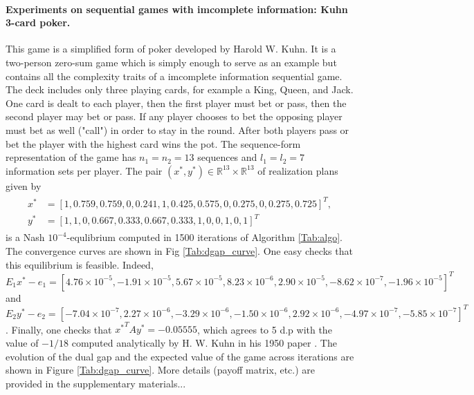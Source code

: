 \documentclass{article} %
\begin{document}
\paragraph{Experiments on sequential games with imcomplete information: Kuhn 3-card
  poker.} This game is a simplified form of poker
developed by Harold W. Kuhn. It is a two-person zero-sum game which is
simply enough to serve as an example but contains all the complexity
traits of a imcomplete information sequential game. The
deck includes only three playing cards, for example a King, Queen, and
Jack. One card is dealt to each player, then the first player must bet
or pass, then the second player may bet or pass. If any player chooses
to bet the opposing player must bet as well ("call") in order to stay
in the round. After both players pass or bet the player with the
highest card wins the pot. The
sequence-form representation of the game has $n_1 = n_2 = 13$
sequences and $l_1 = l_2 = 7$ information
sets per player. The pair $(x^*, y^*) \in \mathbb{R}^{13} \times
\mathbb{R}^{13}$ of realization plans given by
\begin{eqnarray*}
  \begin{split}
    x^* &= [1, 0.759, 0.759, 0, 0.241, 1, 0.425, 0.575, 0, 0.275, 0,
      0.275, 0.725]^T,\\
    y^* &= [1, 1, 0, 0.667, 0.333, 0.667, 0.333, 1, 0, 0, 1, 0, 1]^T
    \end{split}
\end{eqnarray*}
is a Nash $10^{-4}$-equlibrium computed in 1500 iterations of
Algorithm  \ref{Tab:algo}. The convergence curves are shown
in Fig \ref{Tab:dgap_curve}. One easy checks that this equilibrium is
feasible. Indeed, $E_1x^* - e_1 = [4.76 \times 10^{-5}, -1.91 \times 10^{-5}, 5.67
      \times 10^{-5}, 8.23 \times 10^{-6}, 2.90 \times 10^{-5},
      -8.62 \times 10^{-7}, -1.96 \times 10^{-5}]^T$
and
$E_2y^* - e_2 = [-7.04 \times 10^{-7}, 2.27 \times 10^{-6}, -3.29
  \times 10^{-6}, -1.50 \times 10^{-6},
      2.92 \times 10^{-6}, -4.97 \times 10^{-7}, -5.85 \times
      10^{-7}]^T$.
Finally, one checks that ${x^*}^TAy^* = {-0.05555}$,
 which agrees to 5 d.p with the value of $-1 / 18$ computed
 analytically by H. W. Kuhn in his 1950 paper \cite{kuhn}. The
 evolution of the dual gap and the expected value of the game across
 iterations are shown in Figure \ref{Tab:dgap_curve}.
More details (payoff matrix, etc.) are provided in
the supplementary materials...
\end{document}
